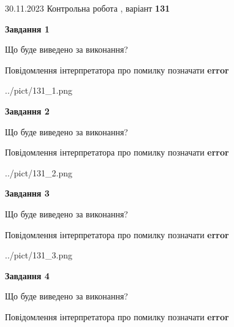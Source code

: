 \documentclass[12pt, ukrainian]{article}
\begin{document}
{{30.11.2023 Контрольна робота , варіант  \No \textbf { 131 }\par}}
{




{\begin {center}\textbf{Завдання 1}\end {center}}\par
Що буде виведено за виконання? \par
Повідомлення інтерпретатора про помилку позначати \textbf{error}

\begin{center}
	{../pict/131_1.png}
\end{center}
\newpage

{\begin {center}\textbf{Завдання 2}\end {center}}\par
Що буде виведено за виконання? \par
Повідомлення інтерпретатора про помилку позначати \textbf{error}

\begin{center}
	{../pict/131_2.png}
\end{center}
\newpage

{\begin {center}\textbf{Завдання 3}\end {center}}\par
Що буде виведено за виконання? \par
Повідомлення інтерпретатора про помилку позначати \textbf{error}

\begin{center}
	{../pict/131_3.png}
\end{center}
\newpage

{\begin {center}\textbf{Завдання 4}\end {center}}\par
Що буде виведено за виконання? \par
Повідомлення інтерпретатора про помилку позначати \textbf{error}

}
\end{document}
